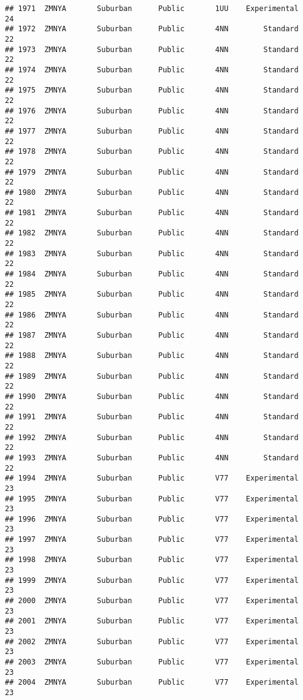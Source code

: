 \documentclass[
]{article}
\begin{document}
\begin{verbatim}
## 1971  ZMNYA       Suburban      Public       1UU    Experimental        24
## 1972  ZMNYA       Suburban      Public       4NN        Standard        22
## 1973  ZMNYA       Suburban      Public       4NN        Standard        22
## 1974  ZMNYA       Suburban      Public       4NN        Standard        22
## 1975  ZMNYA       Suburban      Public       4NN        Standard        22
## 1976  ZMNYA       Suburban      Public       4NN        Standard        22
## 1977  ZMNYA       Suburban      Public       4NN        Standard        22
## 1978  ZMNYA       Suburban      Public       4NN        Standard        22
## 1979  ZMNYA       Suburban      Public       4NN        Standard        22
## 1980  ZMNYA       Suburban      Public       4NN        Standard        22
## 1981  ZMNYA       Suburban      Public       4NN        Standard        22
## 1982  ZMNYA       Suburban      Public       4NN        Standard        22
## 1983  ZMNYA       Suburban      Public       4NN        Standard        22
## 1984  ZMNYA       Suburban      Public       4NN        Standard        22
## 1985  ZMNYA       Suburban      Public       4NN        Standard        22
## 1986  ZMNYA       Suburban      Public       4NN        Standard        22
## 1987  ZMNYA       Suburban      Public       4NN        Standard        22
## 1988  ZMNYA       Suburban      Public       4NN        Standard        22
## 1989  ZMNYA       Suburban      Public       4NN        Standard        22
## 1990  ZMNYA       Suburban      Public       4NN        Standard        22
## 1991  ZMNYA       Suburban      Public       4NN        Standard        22
## 1992  ZMNYA       Suburban      Public       4NN        Standard        22
## 1993  ZMNYA       Suburban      Public       4NN        Standard        22
## 1994  ZMNYA       Suburban      Public       V77    Experimental        23
## 1995  ZMNYA       Suburban      Public       V77    Experimental        23
## 1996  ZMNYA       Suburban      Public       V77    Experimental        23
## 1997  ZMNYA       Suburban      Public       V77    Experimental        23
## 1998  ZMNYA       Suburban      Public       V77    Experimental        23
## 1999  ZMNYA       Suburban      Public       V77    Experimental        23
## 2000  ZMNYA       Suburban      Public       V77    Experimental        23
## 2001  ZMNYA       Suburban      Public       V77    Experimental        23
## 2002  ZMNYA       Suburban      Public       V77    Experimental        23
## 2003  ZMNYA       Suburban      Public       V77    Experimental        23
## 2004  ZMNYA       Suburban      Public       V77    Experimental        23

\end{verbatim}
\end{document}
